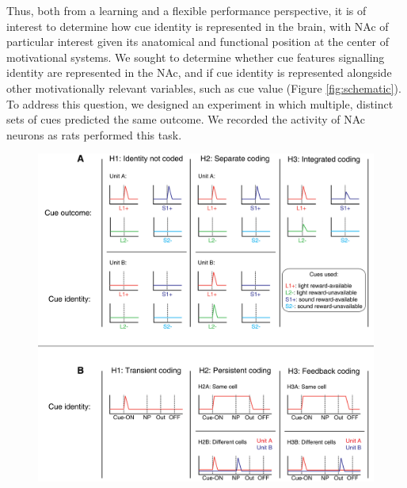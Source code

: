 \documentclass[11pt]{article}
\begin{document}
Thus, both from a learning and a flexible performance perspective, it is of interest to determine how cue identity is represented in the brain, with NAc of particular interest given its anatomical and functional position at the center of motivational systems. We sought to determine whether cue features signalling identity are represented in the NAc, and if cue identity is represented alongside other motivationally relevant variables, such as cue value (Figure \ref{fig:schematic}). To address this question, we designed an experiment in which multiple, distinct sets of cues predicted the same outcome. We recorded the activity of NAc neurons as rats performed this task. 

\begin{figure}
[h]
\centering
\includegraphics[width=\textwidth]{Fig 1 - Schematic neural.png}

\end{figure}
\end{document}
